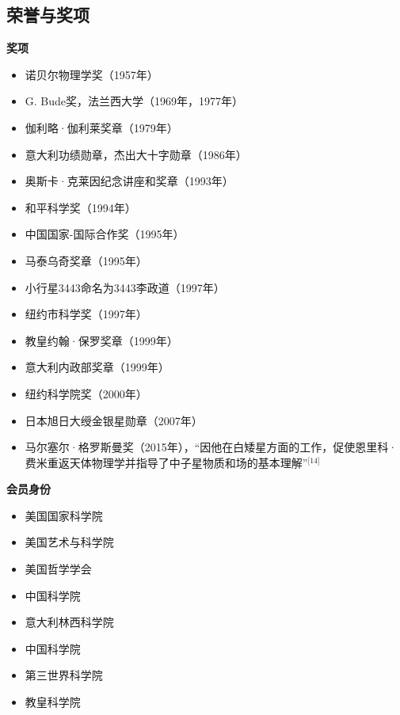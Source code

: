 \subsection{荣誉与奖项}
\textbf{奖项}  
\begin{itemize}
\item 诺贝尔物理学奖（1957年）  
\item G. Bude奖，法兰西大学（1969年，1977年）  
\item 伽利略·伽利莱奖章（1979年）  
\item 意大利功绩勋章，杰出大十字勋章（1986年）  
\item 奥斯卡·克莱因纪念讲座和奖章（1993年）  
\item 和平科学奖（1994年）  
\item 中国国家-国际合作奖（1995年）  
\item 马泰乌奇奖章（1995年）  
\item 小行星3443命名为3443李政道（1997年）  
\item 纽约市科学奖（1997年）  
\item 教皇约翰·保罗奖章（1999年）  
\item 意大利内政部奖章（1999年）  
\item 纽约科学院奖（2000年）  
\item 日本旭日大绶金银星勋章（2007年）  
\item 马尔塞尔·格罗斯曼奖（2015年），“因他在白矮星方面的工作，促使恩里科·费米重返天体物理学并指导了中子星物质和场的基本理解”\(^\text{[14]}\)
\end{itemize}
\textbf{会员身份}  
\begin{itemize}
\item 美国国家科学院  
\item 美国艺术与科学院  
\item 美国哲学学会  
\item 中国科学院  
\item 意大利林西科学院  
\item 中国科学院  
\item 第三世界科学院  
\item 教皇科学院
\end{itemize}
